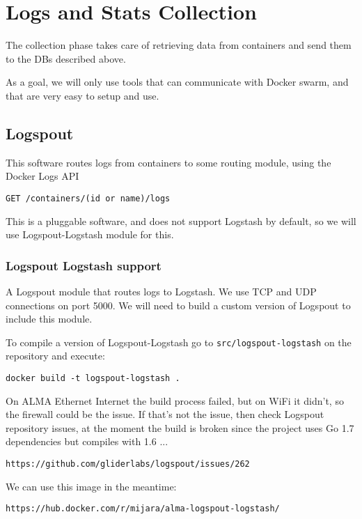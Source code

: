 \chapter{Logs and Stats Collection}

The collection phase takes care of retrieving data from containers and send them to the DBs described above.

As a goal, we will only use tools that can communicate with
Docker swarm, and that are very easy to setup and use.

\section{Logspout}

This software routes logs from containers to some routing module, using the Docker Logs API

\begin{lstlisting}
GET /containers/(id or name)/logs
\end{lstlisting}

This is a pluggable software, and does not support Logstash 
by default, so we will use Logspout-Logstash module for this.

\subsection{Logspout Logstash support}

A Logspout module that routes logs to Logstash. We use TCP 
and UDP connections on port 5000. We will need to build a 
custom version of Logspout to include this module.

To compile a version of Logspout-Logstash go to 
\texttt{src/logspout-logstash} on the repository and execute:

\begin{lstlisting}
docker build -t logspout-logstash .
\end{lstlisting}

\begin{story}
On ALMA Ethernet Internet the build process failed, but on
WiFi it didn't, so the firewall could be the issue. If that's
not the issue, then check Logspout repository issues, at the
moment the build is broken since the project uses Go 1.7
dependencies but compiles with 1.6 ...

\begin{lstlisting}
https://github.com/gliderlabs/logspout/issues/262
\end{lstlisting}

We can use this image in the meantime:

\begin{lstlisting}
https://hub.docker.com/r/mijara/alma-logspout-logstash/
\end{lstlisting}
\end{story}


